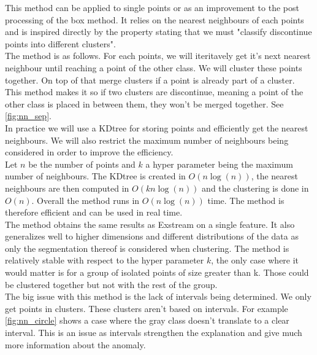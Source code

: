\documentclass[oneside, a4paper, onecolumn, 11pt]{article}
\begin{document}
This method can be applied to single points or as an improvement to the post processing of the box method. It relies on the nearest neighbours of each points and is inspired directly by the property stating that we must "classify discontinue points into different clusters".\\
The method is as follows. For each points, we will iteritavely get it's next nearest neighbour until reaching a point of the other class. We will cluster these points together. On top of that merge clusters if a point is already part of a cluster. This method makes it so if two clusters are discontinue, meaning a point of the other class is placed in between them, they won't be merged together. See \autoref{fig:nn_sep}.\\ 
In practice we will use a KDtree for storing points and efficiently get the nearest neighbours. We will also restrict the maximum number of neighbours being considered in order to improve the efficiency.\\
Let $n$ be the number of points and $k$  a hyper parameter being the maximum number of neighbours. The KDtree is created in $O(n \log(n))$, the nearest neighbours are then computed in $O(k n\log(n))$ and the clustering is done in $O(n)$. Overall the method runs in $O(n \log(n))$ time. The method is therefore efficient and can be used in real time.\\
The method obtains the same results as Exstream on a single feature. It also generalizes well to higher dimensions and different distributions of the data as only the segmentation thereof is considered when clustering. The method is relatively stable with respect to the hyper parameter $k$, the only case where it would matter is for a group of isolated points of size greater than k. Those could be clustered together but not with the rest of the group.\\
The big issue with this method is the lack of intervals being determined. We only get points in clusters. These clusters aren't based on intervals. For example \autoref{fig:nn_circle} shows a case where the gray class doesn't translate to a clear interval. This is an issue as intervals strengthen the explanation and give much more information about the anomaly.
\end{document}
